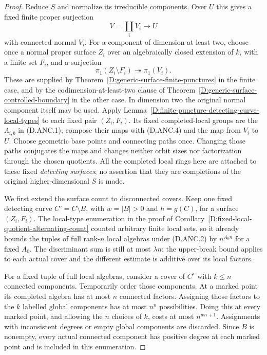 \begin{proof}
Reduce $S$ and normalize its irreducible components. Over $U$ this
gives a fixed finite proper surjection
\[
                         V=\coprod_i V_i\longrightarrow U
                                                               \tag{D.ANC.3}
\]
with connected normal $V_i$. For a component of dimension at least
two, choose once a normal proper surface $Z_i$ over an algebraically
closed extension of $k$, with a finite set $F_i$, and a surjection
\[
        \pi_1(Z_i\setminus F_i)\twoheadrightarrow\pi_1(V_i).
                                                               \tag{D.ANC.4}
\]
These are supplied by
Theorem~\ref{D:generic-surface-finite-punctures} in the finite case,
and by the codimension-at-least-two clause of
Theorem~\ref{D:generic-surface-controlled-boundary} in the other
case. In dimension two the original normal component itself may
be used. Apply
Lemma~\ref{D:finite-puncture-detecting-curve-local-types} to each
fixed pair $(Z_i,F_i)$. Its fixed completed-local groups are the
$\Lambda_{i,b}$ in (D.ANC.1); compose their maps with (D.ANC.4)
and the map from $V_i$ to $U$. Choose geometric base points and
connecting paths once. Changing those paths conjugates the maps
and changes neither orbit sizes nor factorization through the
chosen quotients. All the completed local rings here are attached
to these fixed \emph{detecting surfaces}; no assertion that they
are completions of the original higher-dimensional $S$ is made.

We first extend the surface count to disconnected covers. Keep one
fixed detecting curve $C^\circ=C\setminus B$, with $w=|B|>0$ and
$h=g(C)$, for a surface $(Z_i,F_i)$. The local-type enumeration
in the proof of
Corollary~\ref{D:fixed-local-quotient-alternating-count} counted
arbitrary finite local sets, so it already bounds the tuples of
full rank-$n$ local algebras under (D.ANC.2) by $n^{A_0 n}$ for
a fixed $A_0$. The discriminant sum is still at most $\lambda n$:
the upper-break bound applies to each actual cover and the
different estimate is additive over its local factors.

For a fixed tuple of full local algebras, consider a cover of
$C^\circ$ with $k\le n$ connected components. Temporarily order
those components. At a marked point its completed algebra has
at most $n$ connected factors. Assigning those factors to the
$k$ labelled global components has at most $n^n$ possibilities.
Doing this at every marked point, and allowing the $n$ choices of
$k$, costs at most $n^{w n+1}$. Assignments with inconsistent
degrees or empty global components are discarded. Since $B$ is
nonempty, every actual connected component has positive degree
at each marked point and is included in this enumeration.


\end{proof}
